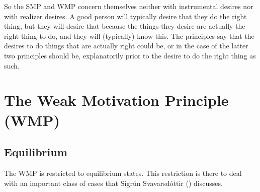 \documentclass[
  10pt,
  letterpaper,
  twoside]{scrbook}
\begin{document}
So the SMP and WMP concern themselves neither with instrumental desires
nor with realizer desires. A good person will typically desire that they
do the right thing, but they will desire that because the things they
desire are actually the right thing to do, and they will (typically)
know this. The principles say that the desires to do things that are
actually right could be, or in the case of the latter two principles
should be, explanatorily prior to the desire to do the right thing as
such.

\section{The Weak Motivation Principle
(WMP)}\label{theweakmotivationprinciplewmp}

\subsection{Equilibrium}\label{equilibrium}

The WMP is restricted to equilibrium states. This restriction is there
to deal with an important class of cases that Sigrún Svavarsdóttir
() discusses.
\end{document}
